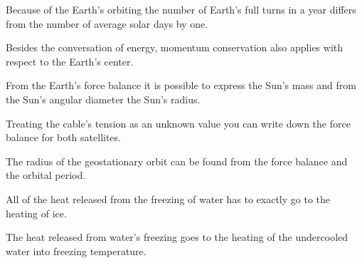 \documentclass[11pt]{article}
\begin{document}

\hinteng
Because of the Earth’s orbiting the number of Earth’s full turns in a year differs from the number of average solar days by one.
\probend
\bigskip


\hinteng
Besides the conversation of energy, momentum conservation also applies with respect to the Earth’s center.
\probend
\bigskip


\hinteng
From the Earth’s force balance it is possible to express the Sun’s mass and from the Sun’s angular diameter the Sun’s radius.
\probend
\bigskip


\hinteng
Treating the cable’s tension as an unknown value you can write down the force balance for both satellites.
\probend
\bigskip


\hinteng
The radius of the geostationary orbit can be found from the force balance and the orbital period.
\probend
\bigskip


\hinteng
All of the heat released from the freezing of water has to exactly go to the heating of ice.
\probend
\bigskip


\hinteng
The heat released from water’s freezing goes to the heating of the undercooled water into freezing temperature.
\probend
\bigskip

\end{document}
